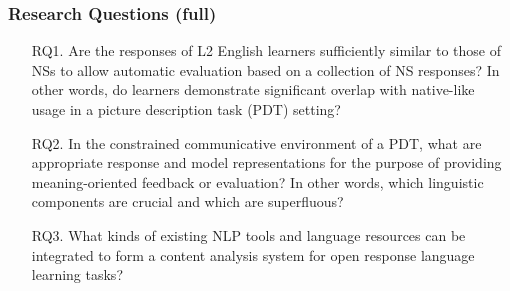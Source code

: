 \documentclass[xcolor={dvipsnames}]{beamer}
\begin{document}
\begin{frame}
\frametitle{Research Questions (full)}
\small
\begin{itemize}
\pause
\vspace{2em}
\item[RQ1.]{Are the responses of L2 English learners sufficiently similar to those of NSs to allow automatic evaluation based on a collection of NS responses? In other words, do learners demonstrate significant overlap with native-like usage in a picture description task (PDT) setting?} %
\vspace{2em}
\pause
\item[RQ2.]{In the constrained communicative environment of a PDT, what are appropriate response and model representations for the purpose of providing meaning-oriented feedback or evaluation? In other words, which linguistic components are crucial and which are superfluous?}

\pause
\vspace{2em}
\item[RQ3.]{What kinds of existing NLP tools and language resources can be integrated to form a content analysis system for open response language learning tasks?}
\end{itemize}
\end{frame}
\end{document}
